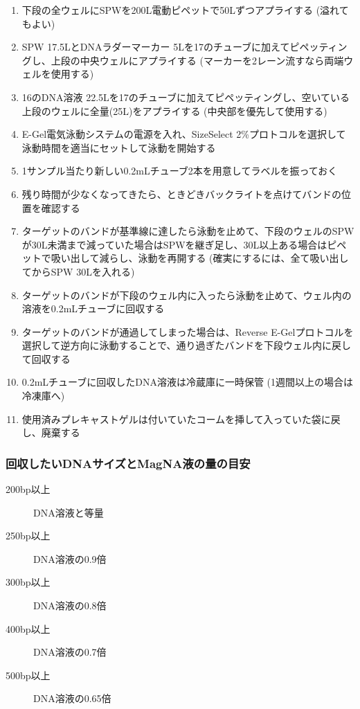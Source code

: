 \documentclass[titlepage,10pt,a4paper,uplatex]{jsbook}
\begin{document}
\begin{enumerate}
\item 下段の全ウェルにSPWを200{\textmu}L電動ピペットで50{\textmu}Lずつアプライする (溢れてもよい)
\item SPW 17.5{\textmu}LとDNAラダーマーカー 5{\textmu}Lを17のチューブに加えてピペッティングし、上段の中央ウェルにアプライする (マーカーを2レーン流すなら両端ウェルを使用する)
\item 16のDNA溶液 22.5{\textmu}Lを17のチューブに加えてピペッティングし、空いている上段のウェルに全量(25{\textmu}L)をアプライする (中央部を優先して使用する)
\item E-Gel電気泳動システムの電源を入れ、SizeSelect 2\%プロトコルを選択して泳動時間を適当にセットして泳動を開始する
\item 1サンプル当たり新しい0.2mLチューブ2本を用意してラベルを振っておく
\item 残り時間が少なくなってきたら、ときどきバックライトを点けてバンドの位置を確認する
\item ターゲットのバンドが基準線に達したら泳動を止めて、下段のウェルのSPWが30{\textmu}L未満まで減っていた場合はSPWを継ぎ足し、30{\textmu}L以上ある場合はピペットで吸い出して減らし、泳動を再開する (確実にするには、全て吸い出してからSPW 30{\textmu}Lを入れる)
\item ターゲットのバンドが下段のウェル内に入ったら泳動を止めて、ウェル内の溶液を0.2mLチューブに回収する
\item ターゲットのバンドが通過してしまった場合は、Reverse E-Gelプロトコルを選択して逆方向に泳動することで、通り過ぎたバンドを下段ウェル内に戻して回収する
\item 0.2mLチューブに回収したDNA溶液は冷蔵庫に一時保管 (1週間以上の場合は冷凍庫へ)
\item 使用済みプレキャストゲルは付いていたコームを挿して入っていた袋に戻し、廃棄する
\end{enumerate}

\subsubsection{回収したいDNAサイズとMagNA液の量の目安}
\begin{description}
\item[200bp以上] DNA溶液と等量
\item[250bp以上] DNA溶液の0.9倍
\item[300bp以上] DNA溶液の0.8倍
\item[400bp以上] DNA溶液の0.7倍
\item[500bp以上] DNA溶液の0.65倍
\end{description}
\end{document}
